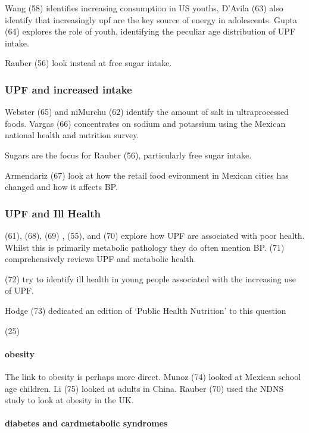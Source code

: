 \documentclass[
]{article}
\begin{document}
Wang (58) identifies increasing consumption in US youths, D'Avila (63)
also identify that increasingly upf are the key source of energy in
adolescents. Gupta (64) explores the role of youth, identifying the
peculiar age distribution of UPF intake.

Rauber (56) look instead at free sugar intake.

\hypertarget{upf-and-increased-intake}{%
\subsubsection{UPF and increased
intake}\label{upf-and-increased-intake}}

Webster (65) and niMurchu (62) identify the amount of salt in
ultraprocessed foods. Vargas (66) concentrates on sodium and potassium
using the Mexican national health and nutrition survey.

Sugars are the focus for Rauber (56), particularly free sugar intake.

Armendariz (67) look at how the retail food evironment in Mexican cities
has changed and how it affects BP.

\hypertarget{upf-and-ill-health}{%
\subsubsection{UPF and Ill Health}\label{upf-and-ill-health}}

(61), (68), (69) , (55), and (70) explore how UPF are associated with
poor health. Whilst this is primarily metabolic pathology they do often
mention BP. (71) comprehensively reviews UPF and metabolic health.

(72) try to identify ill health in young people associated with the
increasing use of UPF.

Hodge (73) dedicated an edition of `Public Health Nutrition' to this
question

(25)

\hypertarget{obesity}{%
\paragraph{obesity}\label{obesity}}

The link to obesity is perhaps more direct. Munoz (74) looked at Mexican
school age children. Li (75) looked at adults in China. Rauber (70) used
the NDNS study to look at obesity in the UK.

\hypertarget{diabetes-and-cardmetabolic-syndromes}{%
\paragraph{diabetes and cardmetabolic
syndromes}\label{diabetes-and-cardmetabolic-syndromes}}
\end{document}
